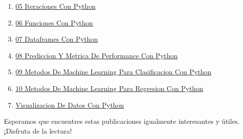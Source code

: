 \documentclass[
  doc,
  floatsintext,
  longtable,
  a4paper,
  nolmodern,
  notxfonts,
  notimes,
  12pt,
  colorlinks=true,linkcolor=blue,citecolor=blue,urlcolor=blue]{apa7}
\begin{document}
\begin{enumerate}
{  Ejecucion Condicional Con Python}
\item
  \href{https://numerus-scriptum.netlify.app/python/2021-06-21-05-iteraciones-con-python/index.pdf}{}
  \href{https://numerus-scriptum.netlify.app/python/2021-06-21-05-iteraciones-con-python}{05
  Iteraciones Con Python}
\item
  \href{https://numerus-scriptum.netlify.app/python/2021-08-16-06-funciones-con-python/index.pdf}{}
  \href{https://numerus-scriptum.netlify.app/python/2021-08-16-06-funciones-con-python}{06
  Funciones Con Python}
\item
  \href{https://numerus-scriptum.netlify.app/python/2021-08-23-07-dataframes-con-python/index.pdf}{}
  \href{https://numerus-scriptum.netlify.app/python/2021-08-23-07-dataframes-con-python}{07
  Dataframes Con Python}
\item
  \href{https://numerus-scriptum.netlify.app/python/2021-11-29-08-prediccion-y-metrica-de-performance-con-python/index.pdf}{}
  \href{https://numerus-scriptum.netlify.app/python/2021-11-29-08-prediccion-y-metrica-de-performance-con-python}{08
  Prediccion Y Metrica De Performance Con Python}
\item
  \href{https://numerus-scriptum.netlify.app/python/2021-12-06-09-metodos-de-machine-learning-para-clasificacion-con-python/index.pdf}{}
  \href{https://numerus-scriptum.netlify.app/python/2021-12-06-09-metodos-de-machine-learning-para-clasificacion-con-python}{09
  Metodos De Machine Learning Para Clasificacion Con Python}
\item
  \href{https://numerus-scriptum.netlify.app/python/2021-12-13-10-metodos-de-machine-learning-para-regresion-con-python/index.pdf}{}
  \href{https://numerus-scriptum.netlify.app/python/2021-12-13-10-metodos-de-machine-learning-para-regresion-con-python}{10
  Metodos De Machine Learning Para Regresion Con Python}
\item
  \href{https://numerus-scriptum.netlify.app/python/2025-05-10-visualizacion-de-datos-con-python/index.pdf}{}
  \href{https://numerus-scriptum.netlify.app/python/2025-05-10-visualizacion-de-datos-con-python}{Visualizacion
  De Datos Con Python}
\end{enumerate}

Esperamos que encuentres estas publicaciones igualmente interesantes y
útiles. ¡Disfruta de la lectura!
\end{document}
